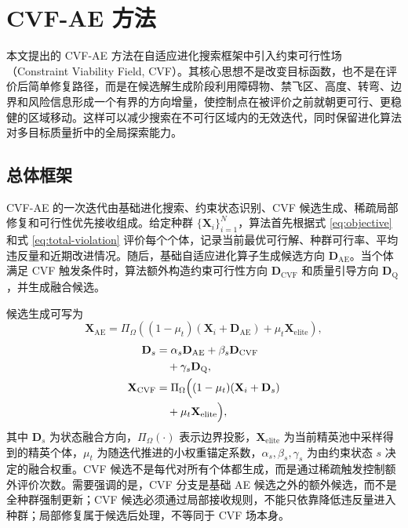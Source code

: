 ﻿\section{CVF-AE 方法}
\label{sec:method}

本文提出的 CVF-AE 方法在自适应进化搜索框架中引入约束可行性场（Constraint Viability Field, CVF）。其核心思想不是改变目标函数，也不是在评价后简单修复路径，而是在候选解生成阶段利用障碍物、禁飞区、高度、转弯、边界和风险信息形成一个有界的方向增量，使控制点在被评价之前就朝更可行、更稳健的区域移动。这样可以减少搜索在不可行区域内的无效迭代，同时保留进化算法对多目标质量折中的全局探索能力。

\subsection{总体框架}

CVF-AE 的一次迭代由基础进化搜索、约束状态识别、CVF 候选生成、稀疏局部修复和可行性优先接收组成。给定种群 $\{\mathbf{X}_i\}_{i=1}^{N}$，算法首先根据式 \eqref{eq:objective} 和式 \eqref{eq:total-violation} 评价每个个体，记录当前最优可行解、种群可行率、平均违反量和近期改进情况。随后，基础自适应进化算子生成候选方向 $\mathbf{D}_{\mathrm{AE}}$。当个体满足 CVF 触发条件时，算法额外构造约束可行性方向 $\mathbf{D}_{\mathrm{CVF}}$ 和质量引导方向 $\mathbf{D}_{\mathrm{Q}}$，并生成融合候选。

候选生成可写为
\begin{equation}
    \mathbf{X}_{\mathrm{AE}} =
    \Pi_{\Omega}
    \left(
    (1-\mu_t)(\mathbf{X}_i+\mathbf{D}_{\mathrm{AE}})
    +\mu_t\mathbf{X}_{\mathrm{elite}}
    \right),
    \label{eq:ae-candidate}
\end{equation}
\begin{equation}
    \begin{aligned}
    \mathbf{D}_s
    &=
    \alpha_s \mathbf{D}_{\mathrm{AE}}
    + \beta_s \mathbf{D}_{\mathrm{CVF}}\\
    &\quad
    + \gamma_s \mathbf{D}_{\mathrm{Q}},\\
    \mathbf{X}_{\mathrm{CVF}}
    &=
    \Pi_{\Omega}
    \Bigl(
    (1-\mu_t)(\mathbf{X}_i+\mathbf{D}_s)\\
    &\quad
    +\mu_t\mathbf{X}_{\mathrm{elite}}
    \Bigr),
    \end{aligned}
    \label{eq:cvf-candidate}
\end{equation}
其中 $\mathbf{D}_s$ 为状态融合方向，$\Pi_{\Omega}(\cdot)$ 表示边界投影，$\mathbf{X}_{\mathrm{elite}}$ 为当前精英池中采样得到的精英个体，$\mu_t$ 为随迭代推进的小权重锚定系数，$\alpha_s,\beta_s,\gamma_s$ 为由约束状态 $s$ 决定的融合权重。CVF 候选不是每代对所有个体都生成，而是通过稀疏触发控制额外评价次数。需要强调的是，CVF 分支是基础 AE 候选之外的额外候选，而不是全种群强制更新；CVF 候选必须通过局部接收规则，不能只依靠降低违反量进入种群；局部修复属于候选后处理，不等同于 CVF 场本身。

